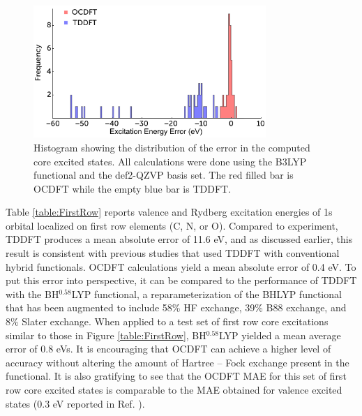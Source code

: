 \documentclass[12pt]{article}
\begin{document}
\begin{figure}[!t]
\centering
\includegraphics[width=8.8cm]{NEW_histogram2.pdf}
\caption{Histogram showing the distribution of the error in the computed core excited states. All calculations were done using the B3LYP functional and the def2-QZVP basis set. The red filled bar is OCDFT while the empty blue bar is TDDFT.}
\label{figure:Hist}
\end{figure}
Table \ref{table:FirstRow} reports valence and Rydberg excitation energies of 1s orbital localized on first row elements (C, N, or O). Compared to experiment, TDDFT produces a mean absolute error of 11.6 eV, and as discussed earlier, this result is consistent with previous studies that used TDDFT with conventional hybrid functionals.\cite{besley_self-consistent-field_2009} OCDFT calculations yield a mean absolute error of 0.4 eV. To put this error into perspective, it can be compared to the performance of TDDFT with the BH$^{0.58}$LYP functional,\cite{besley_time-dependent_2009} a reparameterization of the BHLYP functional that has been augmented to include 58\% HF exchange, 39\% B88 exchange, and 8\% Slater exchange. When applied to a test set of first row core excitations similar to those in Figure \ref{table:FirstRow}, BH$^{0.58}$LYP yielded a mean average error of 0.8 eVs. It is encouraging that OCDFT can achieve a higher level of accuracy without altering the amount of Hartree -- Fock exchange present in the functional. It is also gratifying to see that the OCDFT MAE for this set of first row core excited states is comparable to the MAE obtained for valence excited states (0.3 eV reported in Ref. ).
\end{document}
